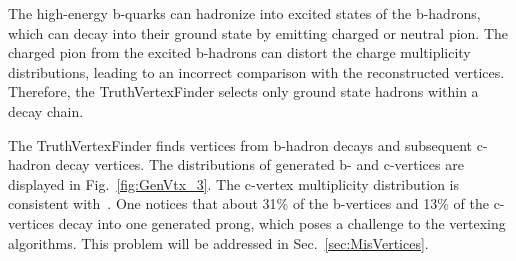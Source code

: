 

The high-energy b-quarks can hadronize into excited states of the b-hadrons, which can decay into their ground state by emitting charged or neutral pion. 
The charged pion from the excited b-hadrons can distort the charge multiplicity distributions, leading to an incorrect comparison with the reconstructed vertices. Therefore, the TruthVertexFinder selects only ground state hadrons within a decay chain. 

The TruthVertexFinder finds vertices from b-hadron decays and subsequent c-hadron decay vertices. The distributions of generated b- and c-vertices are displayed in Fig.~\ref{fig:GenVtx_3}. 
The c-vertex multiplicity distribution is consistent with~\cite{bib:PDG}. 
One notices that about 31\% of the b-vertices and 13\% of the c-vertices decay into one generated prong, which poses a challenge to the vertexing algorithms. This problem will be addressed in Sec.~\ref{sec:MisVertices}.

